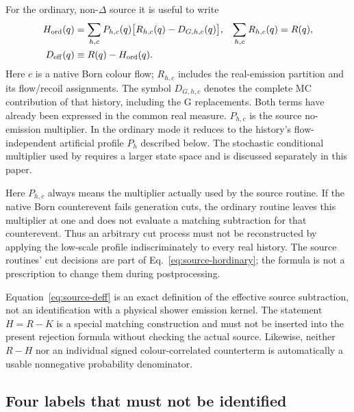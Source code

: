 For the ordinary, non-$\Delta$ source it is useful to write
\begin{align}
 H_{\rm ord}(q)
 &=\sum_{h,c}P_{h,c}(q)
       \bigl[R_{h,c}(q)-D_{G,h,c}(q)\bigr],
 &\sum_{h,c}R_{h,c}(q)&=R(q),
 \label{eq:source-hordinary}\\
 D_{\rm eff}(q)&\equiv R(q)-H_{\rm ord}(q).
 \label{eq:source-deff}
\end{align}
Here $c$ is a native Born colour flow; $R_{h,c}$ includes the real-emission
partition and its flow/recoil assignments. The symbol $D_{G,h,c}$ denotes
the complete MC contribution of that history, including the G replacements.
Both terms have already been expressed in the common real measure.
$P_{h,c}$ is the source no-emission multiplier. In the ordinary mode it
reduces to the history's flow-independent artificial profile $P_h$
described below. The stochastic
conditional multiplier used by \DeltaMC{} requires a larger state space and
is discussed separately in this paper.

Here $P_{h,c}$ always means the multiplier actually used by the source
routine. If the native Born counterevent fails generation cuts, the
ordinary routine leaves this multiplier at one and does not evaluate a
matching subtraction for that counterevent. Thus an arbitrary cut process
must not be reconstructed by applying the low-scale profile indiscriminately
to every real history. The source routines' cut decisions are part of
Eq.~\eqref{eq:source-hordinary}; the formula is not a prescription to change
them during postprocessing.

Equation~\eqref{eq:source-deff} is an exact definition of the effective
source subtraction, not an identification with a physical shower emission
kernel. The statement $H=R-K$ is a special matching construction and must
not be inserted into the present rejection formula without checking the
actual source. Likewise, neither $R-H$ nor an individual signed
colour-correlated counterterm is automatically a usable nonnegative
probability denominator.

\subsection{Four labels that must not be identified}
\label{sec:source-labels}


